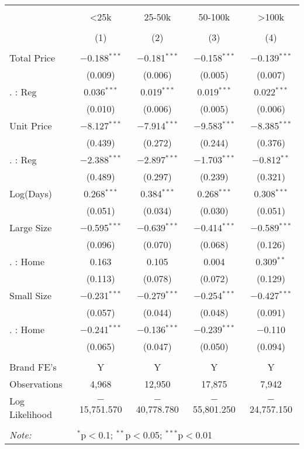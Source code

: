 
\begin{table}[!htbp] \centering 
  \caption{} 
  \label{} 
\begin{tabular}{@{\extracolsep{5pt}}lcccc} 
\\[-1.8ex]\hline 
\hline \\[-1.8ex] 
 & <25k & 25-50k & 50-100k & >100k \\ 
\\[-1.8ex] & (1) & (2) & (3) & (4)\\ 
\hline \\[-1.8ex] 
 Total Price & $-$0.188$^{***}$ & $-$0.181$^{***}$ & $-$0.158$^{***}$ & $-$0.139$^{***}$ \\ 
  & (0.009) & (0.006) & (0.005) & (0.007) \\ 
  . : Reg & 0.036$^{***}$ & 0.019$^{***}$ & 0.019$^{***}$ & 0.022$^{***}$ \\ 
  & (0.010) & (0.006) & (0.005) & (0.006) \\ 
  Unit Price & $-$8.127$^{***}$ & $-$7.914$^{***}$ & $-$9.583$^{***}$ & $-$8.385$^{***}$ \\ 
  & (0.439) & (0.272) & (0.244) & (0.376) \\ 
  . : Reg & $-$2.388$^{***}$ & $-$2.897$^{***}$ & $-$1.703$^{***}$ & $-$0.812$^{**}$ \\ 
  & (0.489) & (0.297) & (0.239) & (0.321) \\ 
  Log(Days) & 0.268$^{***}$ & 0.384$^{***}$ & 0.268$^{***}$ & 0.308$^{***}$ \\ 
  & (0.051) & (0.034) & (0.030) & (0.051) \\ 
  Large Size & $-$0.595$^{***}$ & $-$0.639$^{***}$ & $-$0.414$^{***}$ & $-$0.589$^{***}$ \\ 
  & (0.096) & (0.070) & (0.068) & (0.126) \\ 
  . : Home & 0.163 & 0.105 & 0.004 & 0.309$^{**}$ \\ 
  & (0.113) & (0.078) & (0.072) & (0.129) \\ 
  Small Size & $-$0.231$^{***}$ & $-$0.279$^{***}$ & $-$0.254$^{***}$ & $-$0.427$^{***}$ \\ 
  & (0.057) & (0.044) & (0.048) & (0.091) \\ 
  . : Home & $-$0.241$^{***}$ & $-$0.136$^{***}$ & $-$0.239$^{***}$ & $-$0.110 \\ 
  & (0.065) & (0.047) & (0.050) & (0.094) \\ 
 \hline \\[-1.8ex] 
Brand FE's & Y & Y & Y & Y \\ 
Observations & 4,968 & 12,950 & 17,875 & 7,942 \\ 
Log Likelihood & $-$15,751.570 & $-$40,778.780 & $-$55,801.250 & $-$24,757.150 \\ 
\hline 
\hline \\[-1.8ex] 
\textit{Note:}  & \multicolumn{4}{l}{$^{*}$p$<$0.1; $^{**}$p$<$0.05; $^{***}$p$<$0.01} \\ 
\end{tabular} 
\end{table} 
